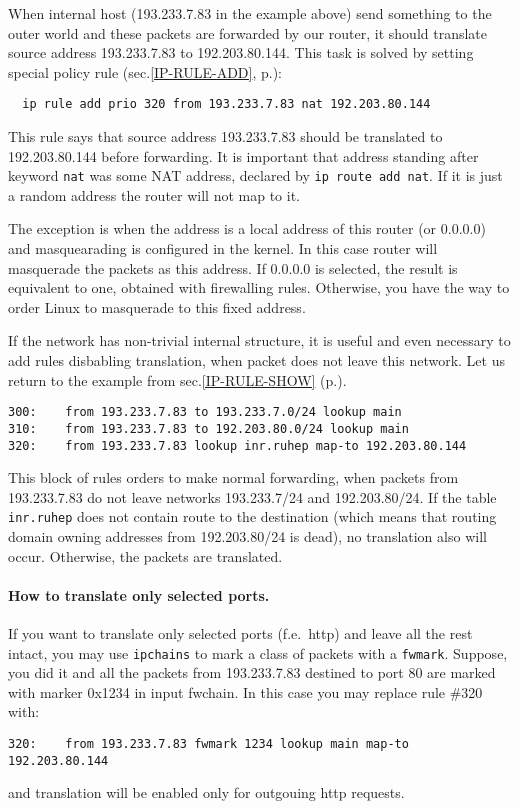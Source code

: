When internal host (193.233.7.83 in the example above)
send something to the outer world and these packets are forwarded
by our router, it should translate source address 193.233.7.83
to 192.203.80.144. This task is solved by setting special
policy rule (sec.\ref{IP-RULE-ADD}, p.\pageref{IP-RULE-ADD}):
\begin{verbatim}
  ip rule add prio 320 from 193.233.7.83 nat 192.203.80.144
\end{verbatim}
This rule says that source address 193.233.7.83
should be translated to 192.203.80.144 before forwarding.
It is important that address standing after keyword \verb|nat|
was some NAT address, declared by {\tt ip route add nat}.
If it is just a random address the router will not map to it.
\begin{NB}
The exception is when the address is a local address of this
router (or 0.0.0.0) and masquearading is configured in the kernel.
In this case router will masquerade the packets as this address.
If 0.0.0.0 is selected, the result is equivalent to one,
obtained with firewalling rules. Otherwise, you have the way
to order Linux to masquerade to this fixed address.
\end{NB}

If the network has non-trivial internal structure, it is
useful and even necessary to add rules disbabling translation,
when packet does not leave this network. Let us return to the
example from sec.\ref{IP-RULE-SHOW} (p.\pageref{IP-RULE-SHOW}).
\begin{verbatim}
300:	from 193.233.7.83 to 193.233.7.0/24 lookup main
310:	from 193.233.7.83 to 192.203.80.0/24 lookup main
320:	from 193.233.7.83 lookup inr.ruhep map-to 192.203.80.144
\end{verbatim}
This block of rules orders to make normal forwarding, when
packets from 193.233.7.83 do not leave networks 193.233.7/24
and 192.203.80/24. If the table \verb|inr.ruhep| does not
contain route to the destination (which means that routing
domain owning addresses from 192.203.80/24 is dead), no translation
also will occur. Otherwise, the packets are translated.

\paragraph{How to translate only selected ports.}
If you want to translate only selected ports (f.e.\ http)
and leave all the rest intact, you may use \verb|ipchains|
to mark a class of packets with a \verb|fwmark|.
Suppose, you did it and all the packets from 193.233.7.83
destined to port 80 are marked with marker 0x1234 in input fwchain.
In this case you may replace rule \#320 with:
\begin{verbatim}
320:	from 193.233.7.83 fwmark 1234 lookup main map-to 192.203.80.144
\end{verbatim}
and translation will be enabled only for outgouing http requests.


